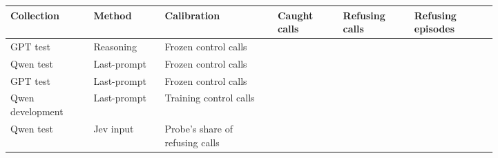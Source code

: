 \begin{tabular}{@{}>{\raggedright\arraybackslash}p{0.14\linewidth}>{\raggedright\arraybackslash}p{0.12\linewidth}>{\raggedright\arraybackslash}p{0.19\linewidth}>{\raggedright\arraybackslash}p{0.11\linewidth}>{\raggedright\arraybackslash}p{0.12\linewidth}>{\raggedright\arraybackslash}p{0.14\linewidth}@{}}
\toprule
Collection & Method & Calibration & Caught calls & Refusing calls & Refusing episodes \\
\midrule
GPT test & Reasoning & Frozen control calls & \gptFreshAlarmZero{} & \gptFreshAlarmOne{} & \gptFreshAlarmTwo{} \\
Qwen test & Last-prompt & Frozen control calls & \qwenFreshAlarmZero{} & \qwenFreshAlarmOne{} & \qwenFreshAlarmTwo{} \\
GPT test & Last-prompt & Frozen control calls & \gptossFreshAlarmZero{} & \gptossFreshAlarmOne{} & \gptossFreshAlarmTwo{} \\
Qwen development & Last-prompt & Training control calls & \qwenDevAlarmProbeZero{} & \qwenDevAlarmProbeOne{} & \qwenDevAlarmProbeTwo{} \\
Qwen test & Jev input & Probe's share of refusing calls & \qwenMatchedJevCaught{} & \qwenMatchedJevRefusing{} & \qwenJevCalibrationMatchedRefusingEpisodesRate{} \\
\bottomrule
\end{tabular}
